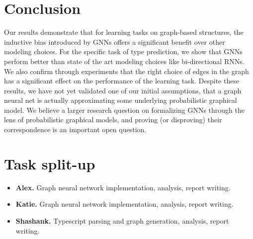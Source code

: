 \section{Conclusion}
\label{sec:conclusions}

Our results demonstrate that for learning tasks on graph-based structures, the inductive bias introduced by GNNs offers a significant benefit over other modeling choices.
For the specific task of type prediction, we show that GNNs perform better than state of the art modeling choices like bi-directional RNNs.
We also confirm through experiments that the right choice of edges in the graph has a significant effect on the performance of the learning task.
Despite these results, we have not yet validated one of our initial assumptions, that a graph neural net is actually approximating some underlying probabilistic graphical model.
We believe a larger research question on formalizing GNNs through the lens of probabilistic graphical models, and proving (or disproving) their correspondence is an important open question.

\section{Task split-up}
\begin{itemize}[]
	\item \textbf{Alex.} Graph neural network implementation, analysis, report writing.
	\item \textbf{Katie.} Graph neural network implementation, analysis, report writing.
	\item \textbf{Shashank.} Typescript parsing and graph generation, analysis, report writing.
\end{itemize}
